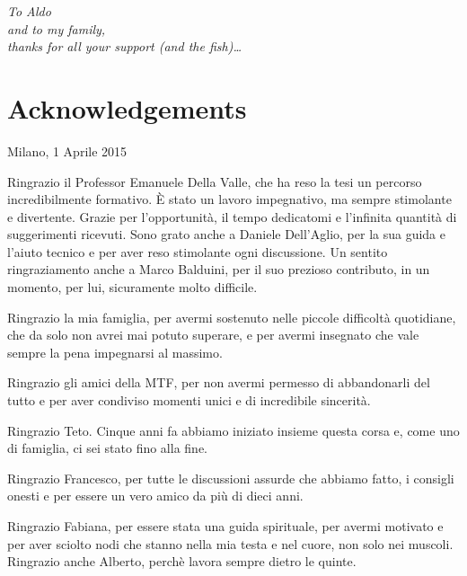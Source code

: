 \begin{flushright}
\large\textit{To Aldo\\ }
\large\textit{and to my family,\\ }
\large\textit{thanks for all your support (and the fish)\dots\\}


\end{flushright}


\cleardoublepage

\thispagestyle{empty}

\chapter*{Acknowledgements}

\begin{flushleft}
Milano, 1 Aprile 2015
\end{flushleft}
Ringrazio il Professor Emanuele Della Valle, che ha reso la tesi un percorso incredibilmente formativo. \`E stato un lavoro impegnativo, ma sempre stimolante e divertente. Grazie per l'opportunit\`a, il tempo dedicatomi e l'infinita quantit\`a di suggerimenti ricevuti. Sono grato anche a Daniele Dell'Aglio, per la sua guida e l'aiuto tecnico e per aver reso stimolante ogni discussione. Un sentito ringraziamento anche a Marco Balduini, per il suo prezioso contributo, in un momento, per lui, sicuramente molto difficile.

Ringrazio la mia famiglia, per avermi sostenuto nelle piccole difficolt\`a quotidiane, che da solo non avrei mai potuto superare, e per avermi insegnato che vale sempre la pena impegnarsi al massimo.

Ringrazio gli amici della MTF, per non avermi permesso di abbandonarli del tutto e per aver condiviso momenti unici e di incredibile sincerit\`a.

Ringrazio Teto. Cinque anni fa abbiamo iniziato insieme questa corsa e, come uno di famiglia, ci sei stato fino alla fine.

Ringrazio Francesco, per tutte le discussioni assurde che abbiamo fatto, i consigli onesti e per essere un vero amico da pi\`u di dieci anni.

Ringrazio Fabiana, per essere stata una guida spirituale, per avermi motivato e per aver sciolto nodi che stanno nella mia testa e nel cuore, non solo nei muscoli. Ringrazio anche Alberto, perch\`e lavora sempre dietro le quinte.

